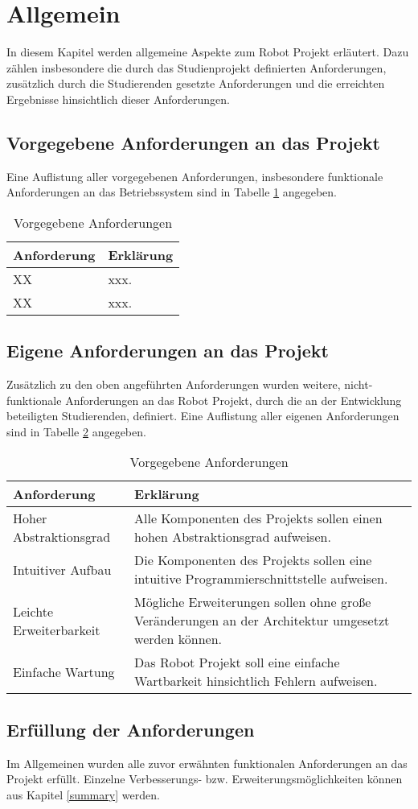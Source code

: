\section{Allgemein}
In diesem Kapitel werden allgemeine Aspekte zum Robot Projekt erläutert. Dazu zählen insbesondere die durch das Studienprojekt definierten Anforderungen, zusätzlich durch die Studierenden gesetzte Anforderungen und die erreichten Ergebnisse hinsichtlich dieser Anforderungen.

\subsection{Vorgegebene Anforderungen an das Projekt}
Eine Auflistung aller vorgegebenen Anforderungen, insbesondere funktionale Anforderungen an das Betriebssystem sind in Tabelle \ref{table:Prescribed-Requirements} angegeben.

\begin{table}[H]
\begin{tabular}{ p{5cm}| p{9cm} }
  \textbf{Anforderung} & \textbf{Erklärung} \\ 
  \hline
  XX & xxx. \\
  XX & xxx. \\
 \end{tabular}
 \caption{Vorgegebene Anforderungen}
 \label{table:Prescribed-Requirements}
\end{table}

\subsection{Eigene Anforderungen an das Projekt}
Zusätzlich zu den oben angeführten Anforderungen wurden weitere, nicht-funktionale Anforderungen an das Robot Projekt, durch die an der Entwicklung beteiligten Studierenden, definiert. Eine Auflistung aller eigenen Anforderungen sind in Tabelle \ref{table:Own-Requirements} angegeben.

\begin{table}[H]
\begin{tabular}{ p{5cm}| p{9cm} }
  \textbf{Anforderung} & \textbf{Erklärung} \\ 
  \hline
  Hoher Abstraktionsgrad & Alle Komponenten des Projekts sollen einen hohen Abstraktionsgrad aufweisen. \\
  Intuitiver Aufbau & Die Komponenten des Projekts sollen eine intuitive Programmierschnittstelle aufweisen. \\
  Leichte Erweiterbarkeit & Mögliche Erweiterungen sollen ohne große Veränderungen an der Architektur umgesetzt werden können. \\
  Einfache Wartung & Das Robot Projekt soll eine einfache Wartbarkeit hinsichtlich Fehlern aufweisen. \\
 \end{tabular}
 \caption{Vorgegebene Anforderungen}
 \label{table:Own-Requirements}
\end{table}

\subsection{Erfüllung der Anforderungen}
Im Allgemeinen wurden alle zuvor erwähnten funktionalen Anforderungen an das Projekt erfüllt. Einzelne Verbesserungs- bzw. Erweiterungsmöglichkeiten können aus Kapitel \ref{summary} werden. 
\pagebreak 